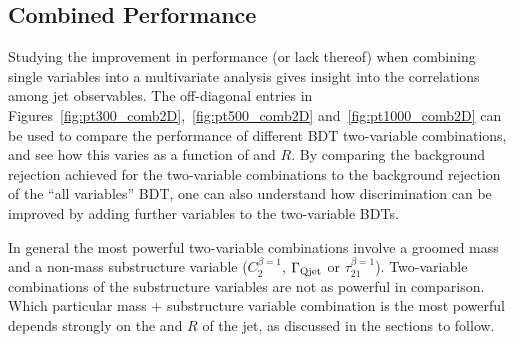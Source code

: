 %


\subsection{Combined Performance}\label{sec:w_combined}

Studying the improvement in performance (or lack thereof) when combining single variables into a multivariate analysis gives insight into the correlations
among jet observables. The off-diagonal entries in Figures~\ref{fig:pt300_comb2D},~\ref{fig:pt500_comb2D}
and~\ref{fig:pt1000_comb2D} can be used to compare the performance
of different BDT two-variable combinations, and see how this varies as
a function of \pt and $R$. By comparing the background rejection
achieved for the two-variable combinations to the background rejection
of the ``all variables'' BDT, one can also understand how 
discrimination can be improved by adding further variables to the
two-variable BDTs.

In general the most powerful two-variable
combinations involve a groomed mass and a non-mass substructure
variable ($C_2^{\beta=1}$, $\Gamma_{\rm Qjet}$ or
$\tau_{21}^{\beta=1}$). Two-variable combinations of the substructure
variables are not as powerful in comparison.  Which particular mass +
substructure variable combination is the most
powerful depends strongly on the \pt and $R$ of the jet, as discussed
in the sections to follow. 

